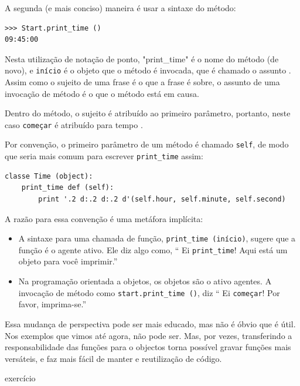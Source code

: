 \documentclass[10pt]{book}
\begin{document}
\begin{v erbatim}
{A segunda (e mais conciso) maneira é usar a sintaxe do método:

\begin{verbatim}
>>> Start.print_time ()
09:45:00
\end{verbatim}
%
Nesta utilização de notação de ponto, \verbo "print_time" é o nome do
método (de novo), e {\tt início} é o objeto que o método é
invocada, que é chamado o assunto {\bf}. Assim como o
sujeito de uma frase é o que a frase é sobre, o assunto
de uma invocação de método é o que o método está em causa.

Dentro do método, o sujeito é atribuído ao primeiro
parâmetro, portanto, neste caso {\tt começar} é atribuído
para {tempo \tt}.

Por convenção, o primeiro parâmetro de um método é
chamado {\tt self}, de modo que seria mais comum para escrever
\Verb "print_time" assim:

\begin{verbatim}
classe Time (object):
    print_time def (self):
        print '.2 d:.2 d:.2 d'(self.hour, self.minute, self.second)
\end{verbatim}
%
A razão para essa convenção é uma metáfora implícita:

\begin{itemize}

\item A sintaxe para uma chamada de função, \verb "print_time (início)",
  sugere que a função é o agente ativo. Ele diz algo
  como, `` Ei \verb "print_time"! Aqui está um objeto para você imprimir.''

\item Na programação orientada a objetos, os objetos são o ativo
  agentes. A invocação de método como \verb "start.print_time ()", diz
  `` Ei {\tt começar}! Por favor, imprima-se.''

\end{itemize}

Essa mudança de perspectiva pode ser mais educado, mas não é óbvio
que é útil. Nos exemplos que vimos até agora, não pode
ser. Mas, por vezes, transferindo a responsabilidade das funções para o
objectos torna possível gravar funções mais versáteis, e faz
mais fácil de manter e reutilização de código.

\begin{} exercício
\label{convert}


\end{}}
\end{v erbatim}
\end{document}
